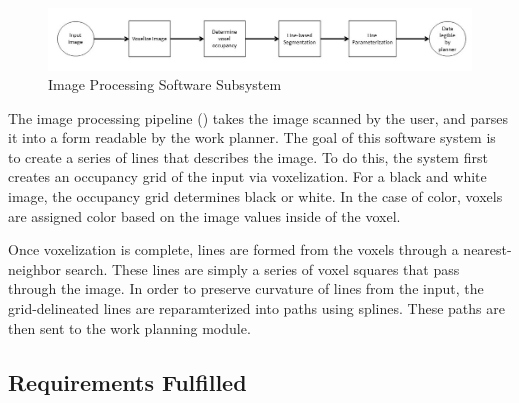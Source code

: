 \begin{figure}[h!]
 \centering
  \includegraphics[width=0.99\columnwidth]{diagrams/sw_arch_image_processing.jpg}
	\caption{Image Processing Software Subsystem}
 \label{fig:image_processing}
\end{figure}

The image processing pipeline () takes the image scanned by the user, and parses it into a form readable by the work planner. The goal of this software system is to create a series of lines that describes the image. To do this, the system first creates an occupancy grid of the input via voxelization. For a black and white image, the occupancy grid determines black or white. In the case of color, voxels are assigned color based on the image values inside of the voxel.

Once voxelization is complete, lines are formed from the voxels through a nearest-neighbor search. These lines are simply a series of voxel squares that pass through the image. In order to preserve curvature of lines from the input, the grid-delineated lines are reparamterized into paths using splines. These paths are then sent to the work planning module.

\subsection{Requirements Fulfilled}
\label{subsec:image_processing_req_fulfilled}
